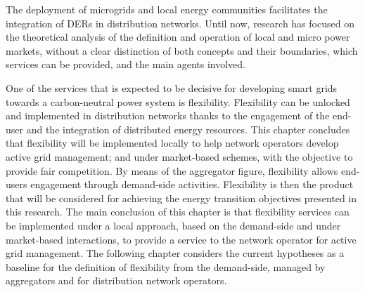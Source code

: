 The deployment of microgrids and local energy communities facilitates the integration of DERs in distribution networks. Until now, research has focused on the theoretical analysis of the definition and operation of local and micro power markets, without a clear distinction of both concepts and their boundaries, which services can be provided, and the main agents involved.  

One of the services that is expected to be decisive for developing smart grids towards a carbon-neutral power system is flexibility. Flexibility can be unlocked and implemented in distribution networks thanks to the engagement of the end-user and the integration of distributed energy resources. This chapter concludes that flexibility will be implemented locally to help network operators develop active grid management; and under market-based schemes, with the objective to provide fair competition. By means of the aggregator figure, flexibility allows end-users engagement through demand-side activities. Flexibility is then the product that will be considered for achieving the energy transition objectives presented in this research. The main conclusion of this chapter is that flexibility services can be implemented under a local approach, based on the demand-side and under market-based interactions, to provide a service to the network operator for active grid management. The following chapter considers the current hypotheses as a baseline for the definition of flexibility from the demand-side, managed by aggregators and for distribution network operators.
	


